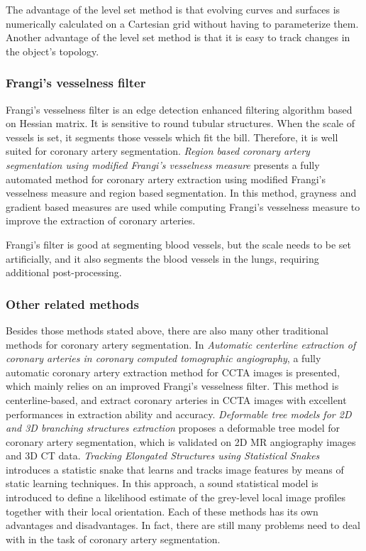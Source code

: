 \documentclass[lang=cn,11pt,a4paper,cite=numbers]{elegantpaper}
\begin{document}
The advantage of the level set method is that evolving curves and surfaces is numerically calculated on a Cartesian grid without having to parameterize them. Another advantage of the level set method is that it is easy to track changes in the object's topology.

\subsubsection{Frangi's vesselness filter}

Frangi's vesselness filter is an edge detection enhanced filtering algorithm based on Hessian matrix. It is sensitive to round tubular structures. When the scale of vessels is set, it segments those vessels which fit the bill. Therefore, it is well suited for coronary artery segmentation. \emph{Region based coronary artery segmentation using modified Frangi's vesselness measure}\cite{6} presents a fully automated method for coronary artery extraction using modified Frangi's vesselness measure and region based segmentation. In this method, grayness and gradient based measures are used while computing Frangi's vesselness measure to improve the extraction of coronary arteries.

Frangi's filter is good at segmenting blood vessels, but the scale needs to be set artificially, and it also segments the blood vessels in the lungs, requiring additional post-processing. 

\subsubsection{Other related methods}

Besides those methods stated above, there are also many other traditional methods for coronary artery segmentation. In \emph{Automatic centerline extraction of coronary arteries in coronary computed tomographic angiography}\cite{7}, a fully automatic coronary artery extraction method for CCTA images is presented, which mainly relies on an improved Frangi's vesselness filter. This method is centerline-based, and extract coronary arteries in CCTA images with excellent performances in extraction ability and accuracy. \emph{Deformable tree models for 2D and 3D branching structures extraction}\cite{8} proposes a deformable tree model for coronary artery segmentation, which is validated on 2D MR angiography images and 3D CT data. \emph{Tracking Elongated Structures using Statistical Snakes}\cite{9} introduces a statistic snake that learns and tracks image features by means of static learning techniques. In this approach, a sound statistical model is introduced to define a likelihood estimate of the grey-level local image profiles together with their local orientation. Each of these methods has its own advantages and disadvantages. In fact, there are still many problems need to deal with in the task of coronary artery segmentation.
\end{document}
